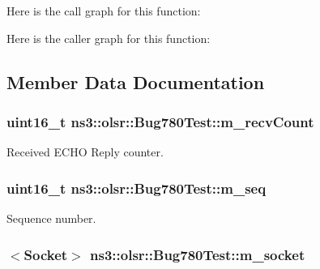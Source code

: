 Here is the call graph for this function\+:




Here is the caller graph for this function\+:




\subsection{Member Data Documentation}
\subsubsection[{\texorpdfstring{m\+\_\+recv\+Count}{m_recvCount}}]{\setlength{\rightskip}{0pt plus 5cm}uint16\+\_\+t ns3\+::olsr\+::\+Bug780\+Test\+::m\+\_\+recv\+Count\hspace{0.3cm}{\ttfamily [private]}}\hypertarget{classns3_1_1olsr_1_1Bug780Test_a01918fdfa2fc906b5d312c2659702187}{}\label{classns3_1_1olsr_1_1Bug780Test_a01918fdfa2fc906b5d312c2659702187}


Received E\+C\+HO Reply counter. 

\subsubsection[{\texorpdfstring{m\+\_\+seq}{m_seq}}]{\setlength{\rightskip}{0pt plus 5cm}uint16\+\_\+t ns3\+::olsr\+::\+Bug780\+Test\+::m\+\_\+seq\hspace{0.3cm}{\ttfamily [private]}}\hypertarget{classns3_1_1olsr_1_1Bug780Test_aa81457cd42c6d221441deeddc2afe51c}{}\label{classns3_1_1olsr_1_1Bug780Test_aa81457cd42c6d221441deeddc2afe51c}


Sequence number. 

\subsubsection[{\texorpdfstring{m\+\_\+socket}{m_socket}}]{$<${\bf Socket}$>$ ns3\+::olsr\+::\+Bug780\+Test\+::m\+\_\+socket\hspace{0.3cm}{\ttfamily [private]}}\hypertarget{classns3_1_1olsr_1_1Bug780Test_ab65d6662ead23b369517b11590e08b09}{}\label{classns3_1_1olsr_1_1Bug780Test_ab65d6662ead23b369517b11590e08b09}


